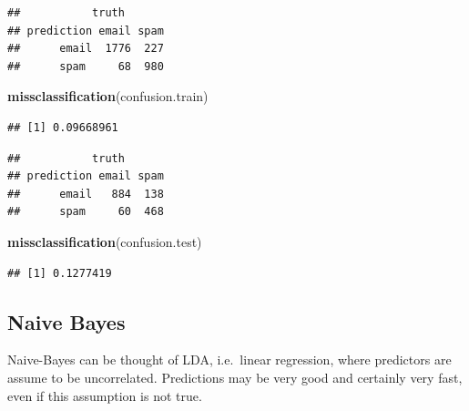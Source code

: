 \documentclass[]{book}
\newenvironment{Shaded}{\begin{snugshade}}{\end{snugshade}}
\newcommand{\CommentTok}[1]{\textcolor[rgb]{0.56,0.35,0.01}{\textit{#1}}}
\newcommand{\DataTypeTok}[1]{\textcolor[rgb]{0.13,0.29,0.53}{#1}}
\newcommand{\FloatTok}[1]{\textcolor[rgb]{0.00,0.00,0.81}{#1}}
\newcommand{\KeywordTok}[1]{\textcolor[rgb]{0.13,0.29,0.53}{\textbf{#1}}}
\newcommand{\NormalTok}[1]{#1}
\newcommand{\OperatorTok}[1]{\textcolor[rgb]{0.81,0.36,0.00}{\textbf{#1}}}
\newcommand{\StringTok}[1]{\textcolor[rgb]{0.31,0.60,0.02}{#1}}
\theoremstyle{definition}
\theoremstyle{definition}
\theoremstyle{definition}
\theoremstyle{remark}
\begin{document}
\begin{verbatim}
##           truth
## prediction email spam
##      email  1776  227
##      spam     68  980
\end{verbatim}

\begin{Shaded}
\begin{Highlighting}[]
\KeywordTok{missclassification}\NormalTok{(confusion.train)}
\end{Highlighting}
\end{Shaded}

\begin{verbatim}
## [1] 0.09668961
\end{verbatim}

\begin{Shaded}
\end{Shaded}

\begin{verbatim}
##           truth
## prediction email spam
##      email   884  138
##      spam     60  468
\end{verbatim}

\begin{Shaded}
\begin{Highlighting}[]
\KeywordTok{missclassification}\NormalTok{(confusion.test)}
\end{Highlighting}
\end{Shaded}

\begin{verbatim}
## [1] 0.1277419
\end{verbatim}

\hypertarget{naive-bayes}{%
\subsection{Naive Bayes}\label{naive-bayes}}

Naive-Bayes can be thought of LDA, i.e.~linear regression, where predictors are assume to be uncorrelated.
Predictions may be very good and certainly very fast, even if this assumption is not true.
\end{document}

